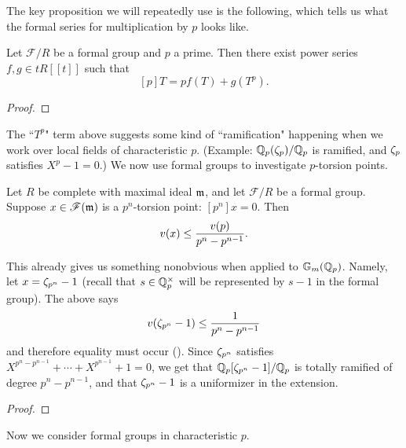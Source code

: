 The key proposition we will repeatedly use is the following, which tells us what the formal series for multiplication by $p$ looks like.
\begin{pr}
Let $\mathscr F/R$ be a formal group and $p$ a prime. Then there exist power series $f,g\in tR[[t]]$ such that
\[
[p]T=pf(T)+g(T^p).
\]
\end{pr}
\begin{proof}

\end{proof}

The ``$T^p$" term above suggests some kind of ``ramification" happening when we work over local fields of characteristic $p$. (Example: $\mathbb{Q}_p(\zeta_p)/\mathbb{Q}_p$ is ramified, and $\zeta_p$ satisfies $X^p-1=0$.) 
We now use formal groups to investigate $p$-torsion points. 
\begin{pr}
Let $R$ be complete with maximal ideal $\mathfrak{m}$, and let
$\mathscr F/R$ be a formal group. Suppose $x\in \mathscr F(\mathfrak{m})$ is a $p^n$-torsion point: $[p^n]x=0$. Then
\[
v(x)\le \frac{v(p)}{p^n-p^{n-1}}.
\]
\end{pr}
\begin{ex}
This already gives us something nonobvious when applied to $\mathbb{G}_m(\mathbb{Q}_p)$. Namely, let $x=\zeta_{p^n}-1$ (recall that $s\in \mathbb{Q}_p^{\times}$ will be represented by $s-1$ in the formal group). The above says
\[
v(\zeta_{p^n}-1)\le \frac{1}{p^n-p^{n-1}}
\]
and therefore equality must occur (). Since $\zeta_{p^n}$ satisfies $X^{p^n-p^{n-1}}+\cdots +X^{p^{n-1}}+1=0$, we get that $\mathbb{Q}_p[\zeta_{p^n}-1]/\mathbb{Q}_p$ is totally ramified of degree $p^n-p^{n-1}$, and that $\zeta_{p^n}-1$ is a uniformizer in the extension.
\end{ex}
\begin{proof}

\end{proof}

Now we consider formal groups in characteristic $p$.

